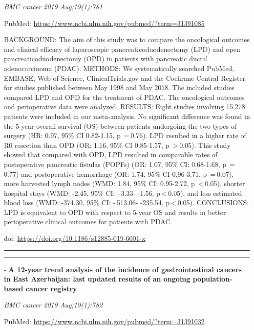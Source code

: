 \documentclass[]{article}
\begin{document}
\emph{BMC cancer 2019 Aug;19(1):781}

PubMed: \url{https://www.ncbi.nlm.nih.gov/pubmed/?term=31391085}

BACKGROUND: The aim of this study was to compare the oncological
outcomes and clinical efficacy of laparoscopic pancreaticoduodenectomy
(LPD) and open pancreaticoduodenectomy (OPD) in patients with pancreatic
ductal adenocarcinoma (PDAC). METHODS: We systematically searched
PubMed, EMBASE, Web of Science, ClinicalTrials.gov and the Cochrane
Central Register for studies published between May 1998 and May 2018.
The included studies compared LPD and OPD for the treatment of PDAC. The
oncological outcomes and perioperative data were analyzed. RESULTS:
Eight studies involving 15,278 patients were included in our
meta-analysis. No significant difference was found in the 5-year overall
survival (OS) between patients undergoing the two types of surgery (HR:
0.97, 95\% CI 0.82-1.15, p~= 0.76). LPD resulted in a higher rate of R0
resection than OPD (OR: 1.16, 95\% CI 0.85-1.57, p~\textgreater{} 0.05).
This study showed that compared with OPD, LPD resulted in comparable
rates of postoperative pancreatic fistulas (POPFs) (OR: 1.07, 95\% CI:
0.68-1.68, p~= 0.77) and postoperative hemorrhage (OR: 1.74, 95\% CI
0.96-3.71, p~= 0.07), more harvested lymph nodes (WMD: 1.84, 95\% CI:
0.95-2.72, p~\textless{} 0.05), shorter hospital stays (WMD: -2.45, 95\%
CI: - 3.33- -1.56, p \textless{} 0.05), and less estimated blood loss
(WMD: -374.30, 95\% CI: - 513.06- -235.54, p \textless{} 0.05).
CONCLUSIONS: LPD is equivalent to OPD with respect to 5-year OS and
results in better perioperative clinical outcomes for patients with
PDAC.

doi: \url{https://doi.org/10.1186/s12885-019-6001-x}

{}

{}

\begin{center}\rule{0.5\linewidth}{\linethickness}\end{center}

\begin{center}\rule{0.5\linewidth}{\linethickness}\end{center}

 - \textbf{A 12-year trend analysis of the incidence of gastrointestinal
cancers in East Azerbaijan: last updated results of an ongoing
population-based cancer registry}

\emph{BMC cancer 2019 Aug;19(1):782}

PubMed: \url{https://www.ncbi.nlm.nih.gov/pubmed/?term=31391032}
\end{document}
